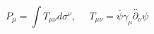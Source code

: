 \begin{equation}
P_{\mu} = \int T_{\mu \nu} d \sigma^{\nu}, ~~~~~~ T_{\mu \nu} =
\bar{\psi}  \gamma_{\mu} \overleftrightarrow{{\partial}_{\nu}} \psi 
\end{equation}

